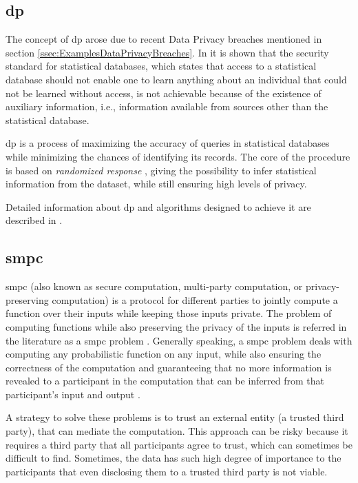 \subsection{\acl{dp}}
\label{ssec:DifferentialPrivacy}


The concept of \acf{dp} arose due to recent Data Privacy breaches mentioned in section \ref{ssec:ExamplesDataPrivacyBreaches}. In \cite{Dwork2006} it is shown that the security standard for statistical databases, which states that access to a statistical database should not enable one to learn anything about an individual that could not be learned without access, is not achievable because of the existence of auxiliary information, i.e., information available from sources other than the statistical database.

\ac{dp} is a process of maximizing the accuracy of queries in statistical databases while minimizing the chances of identifying its records. The core of the procedure is based on \textit{randomized response} \cite{warner1965randomized}, giving the possibility to infer statistical information from the dataset, while still ensuring high levels of privacy.

Detailed information about \ac{dp} and algorithms designed to achieve it are described in \cite{dwork2014algorithmic}.


\subsection{\acl{smpc}} 
\label{ssec:SecureMultiPartyComputation}


\acf{smpc} (also known as secure computation, multi-party computation, or privacy-preserving computation) is a protocol for different parties to jointly compute a function over their inputs while keeping those inputs private. The problem of computing functions while also preserving the privacy of the inputs is referred in the literature as a \ac{smpc} problem \cite{yao1982protocols}. Generally speaking, a \ac{smpc} problem deals with computing any probabilistic function on any input, while also ensuring the correctness of the computation and guaranteeing that no more information is revealed to a participant in the computation that can be inferred from that participant's input and output \cite{goldwasser1997multi}. 

A strategy to solve these problems is to trust an external entity (a trusted third party), that can mediate the computation. This approach can be risky because it requires a third party that all participants agree to trust, which can sometimes be difficult to find. Sometimes, the data has such high degree of importance to the participants that even disclosing them to a trusted third party is not viable.


